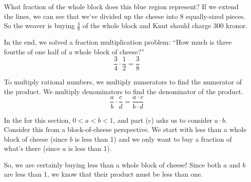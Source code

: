 \begin{center}
\end{center}

What fraction of the whole block does this blue region represent? If we extend the lines, we can see that we've divided up the cheese into 8 equally-sized pieces. So the weaver is buying $\frac{3}{8}$ of the whole block and Knut should charge 300 kronor.

In the end, we solved a fraction multiplication problem: ``How much is three fourths of one half of a whole block of cheese?'' \[\frac{3}{4} \cdot \frac{1}{2} = \frac{3}{8}\] 

\begin{boxeddef}
To multiply rational numbers, we multiply numerators to find the numerator of the product. We multiply denominators to find the denominator of the product. \[\frac{a}{b} \cdot \frac{c}{d} = \frac{a \cdot c}{b \cdot d}\]
\end{boxeddef}

\begin{boxedex}
In the  for this section, $0 < a < b < 1$, and part (c) asks us to consider $a \cdot b$. Consider this from a block-of-cheese perspective. We start with less than a whole block of cheese (since $b$ is less than 1) and we only want to buy a fraction of what's there (since $a$ is less than 1).

So, we are certainly buying less than a whole block of cheese! Since both $a$ and $b$ are less than 1, we know that their product must be less than one.
\end{boxedex}


